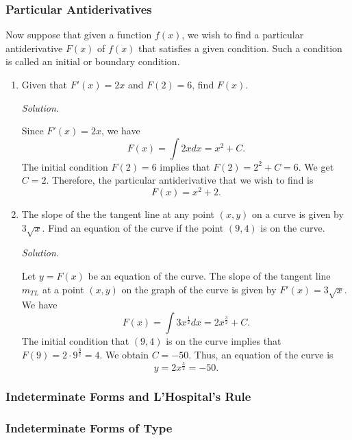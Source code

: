 \documentclass[
  letterpaper,
  DIV=11,
  numbers=noendperiod]{scrartcl}
\theoremstyle{definition}
\theoremstyle{plain}
\theoremstyle{remark}
\begin{document}
\hypertarget{htm:ParticularAntiderivatives}{}
\hypertarget{particular-antiderivatives}{%
\subsubsection{Particular
Antiderivatives}\label{particular-antiderivatives}}

Now suppose that given a function \(f(x)\), we wish to find a particular
antiderivative \(F(x)\) of \(f(x)\) that satisfies a given condition.
Such a condition is called an initial or boundary condition.

\hypertarget{exm:particular_derivatives}{}
\begin{enumerate}
\def\labelenumi{\arabic{enumi}.}
\item
  Given that \(F'(x)=2x\) and \(F(2)=6\), find \(F(x)\).

  \emph{Solution}.

  Since \(F'(x)=2x\), we have \[
  F(x)=\int 2xdx=x^2+C.
  \]The initial condition \(F(2)=6\) implies that \(F(2)=2^2+C=6\). We
  get \(C=2\). Therefore, the particular antiderivative that we wish to
  find is \[
  F(x)=x^2+2.
  \]
\item
  The slope of the the tangent line at any point \((x,y)\) on a curve is
  given by \(3\sqrt x\). Find an equation of the curve if the point
  \((9,4)\) is on the curve.

  \emph{Solution}.

  Let \(y=F(x)\) be an equation of the curve. The slope of the tangent
  line \(m_{TL}\) at a point \((x,y)\) on the graph of the curve is
  given by \(F'(x)=3\sqrt x\). We have \[
  F(x)=\int 3x^\frac{1}{2}dx=2x^\frac{3}{2}+C.
  \] The initial condition that \((9,4)\) is on the curve implies that
  \(F(9)=2\cdot 9^\frac{3}{2}=4\). We obtain \(C=-50\). Thus, an
  equation of the curve is \[
  y=2x^\frac{3}{2}=-50.
  \]
\end{enumerate}

\hypertarget{indeterminate-forms-and-lhospitals-rule}{%
\subsubsection{Indeterminate Forms and L'Hospital's
Rule}\label{indeterminate-forms-and-lhospitals-rule}}

\hypertarget{htm:Indeterminateforms}{}
\hypertarget{indeterminate-forms-of-type}{%
\subsubsection{Indeterminate Forms of
Type}\label{indeterminate-forms-of-type}}
\end{document}
